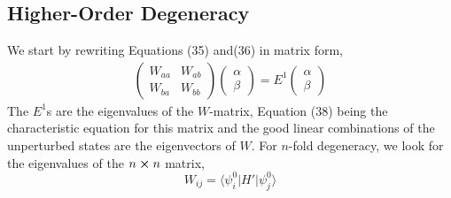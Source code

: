 \subsection{Higher-Order Degeneracy}
We start by rewriting Equations (35) and(36) in matrix form,
\begin{gather}
\begin{pmatrix}
W_{aa} & W_{ab}\\
W_{ba} & W_{bb}
\end{pmatrix}
\begin{pmatrix}
\alpha\\
\beta
\end{pmatrix}
= E^1
\begin{pmatrix}
\alpha\\
\beta
\end{pmatrix}
\end{gather}
The $E^1$s are the eigenvalues of the $W$-matrix, Equation (38) being the characteristic equation for this matrix and the good linear combinations of the unperturbed states are the eigenvectors of $W$. For $n$-fold degeneracy, we look for the eigenvalues of the $n\cross n$ matrix,
\begin{equation}
W_{ij}=\langle \psi^0_i\vert H' \vert \psi^0_j\rangle
\end{equation}
